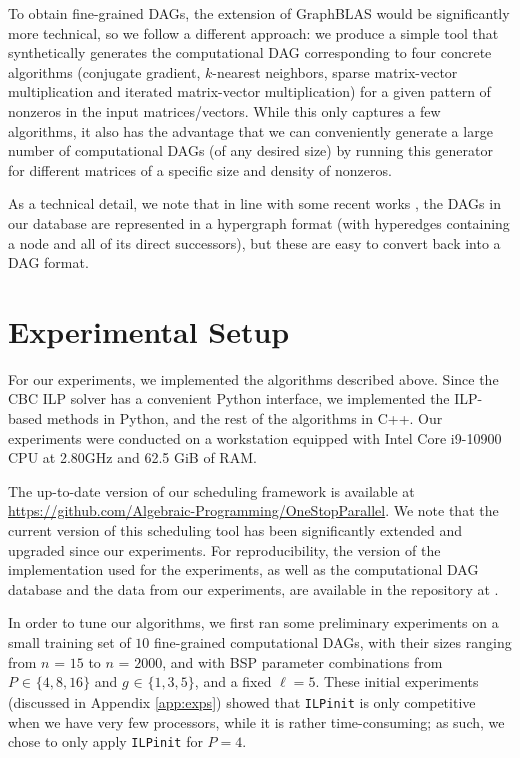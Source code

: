 \documentclass[sigconf,nonacm]{acmart}
\begin{document}
To obtain fine-grained DAGs, the extension of GraphBLAS would be significantly more technical, so we follow a different approach: we produce a simple tool that synthetically generates the computational DAG corresponding to four concrete algorithms (conjugate gradient, $k$-nearest neighbors, sparse matrix-vector multiplication and iterated matrix-vector multiplication) for a given pattern of nonzeros in the input matrices/vectors. While this only captures a few algorithms, it also has the advantage that we can conveniently generate a large number of computational DAGs (of any desired size) by running this generator for different matrices of a specific size and density of nonzeros.

As a technical detail, we note that in line with some recent works \cite{hyperDAG, DAH}, the DAGs in our database are represented in a hypergraph format (with hyperedges containing a node and all of its direct successors), but these are easy to convert back into a DAG format.

\section{Experimental Setup} \label{sec:setup}

For our experiments, we implemented the algorithms described above. Since the CBC ILP solver has a convenient Python interface, we implemented the ILP-based methods in Python, and the rest of the algorithms in C++. Our experiments were conducted on a workstation equipped with Intel Core i9-10900 CPU at 2.80GHz and 62.5 GiB of RAM.

The up-to-date version of our scheduling framework is available at \url{https://github.com/Algebraic-Programming/OneStopParallel}. We note that the current version of this scheduling tool has been significantly extended and upgraded since our experiments. For reproducibility, the version of the implementation used for the experiments, as well as the computational DAG database and the data from our experiments, are available in the repository at \cite{folder}.

In order to tune our algorithms, we first ran some preliminary experiments on a small training set of $10$ fine-grained computational DAGs, with their sizes ranging from $n_{\!}=_{\!}15$ to $n_{\!}=_{\!}2000$, and with BSP parameter combinations from $P _{\!} \in _{\!} \{ 4, 8, 16 \}$ and $g _{\!} \in _{\!} \{ 1, 3, 5 \}$, and a fixed $\ell=5$. These initial experiments (discussed in Appendix \ref{app:exps}) showed that \texttt{ILPinit} is only competitive when we have very few processors, while it is rather time-consuming; as such, we chose to only apply \texttt{ILPinit} for $P=4$.
\end{document}
